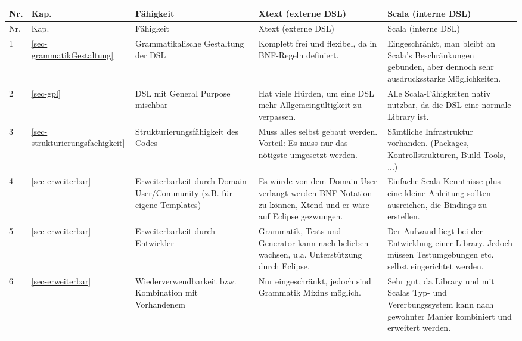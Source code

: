 \begin{landscape}
\begin{longtable}{|p{0.5cm}|p{0.8cm}|p{4.3cm}|p{6.3cm}|p{6.3cm}|}

  \hline
  Nr. & Kap. & Fähigkeit & Xtext (externe DSL) & Scala (interne DSL) \\ \hline \hline
  \endfirsthead

  \hline
  Nr. & Kap. & Fähigkeit & Xtext (externe DSL) & Scala (interne DSL) \\ \hline
  \endhead

  1
  & \ref{sec-grammatikGestaltung}
  & Grammatikalische Gestaltung der DSL
  & {\small Komplett frei und flexibel, da in BNF-Regeln definiert.}
  & {\small Eingeschränkt, man bleibt an Scala's Beschränkungen gebunden, aber
    dennoch sehr ausdrucksstarke Möglichkeiten.}
  \\\hline

  2
  & \ref{sec-gpl}
  & DSL mit General Purpose mischbar
  & {\small Hat viele Hürden, um eine DSL mehr Allgemeingültigkeit zu verpassen.}
  & {\small Alle Scala-Fähigkeiten nativ nutzbar, da die DSL eine normale Library ist.}
  \\\hline

  3
  & \ref{sec-strukturierungsfaehigkeit}
  & Strukturierungsfähigkeit des Codes
  & {\small Muss alles selbst gebaut werden. Vorteil: Es muss nur das nötigste
    umgesetzt werden.}
  & {\small Sämtliche Infrastruktur vorhanden. (Packages, Kontrollstrukturen,
    Build-Tools, ...)}
  \\\hline

  4
  & \ref{sec-erweiterbar}
  & Erweiterbarkeit durch Domain User/Community (z.B. für eigene Templates)
  & {\small Es würde von dem Domain User verlangt werden BNF-Notation zu können,
    Xtend und er wäre auf Eclipse gezwungen.}
  & {\small Einfache Scala Kenntnisse plus eine kleine Anleitung sollten ausreichen,
    die Bindings zu erstellen.}
  \\\hline

  5
  & \ref{sec-erweiterbar}
  & Erweiterbarkeit durch Entwickler
  & {\small Grammatik, Tests und Generator kann nach belieben wachsen, u.a.
    Unterstützung durch Eclipse.}
  & {\small Der Aufwand liegt bei der Entwicklung einer Library. Jedoch müssen
    Testumgebungen etc. selbst eingerichtet werden.}
  \\\hline

  6
  & \ref{sec-erweiterbar}
  & Wiederverwendbarkeit bzw. Kombination mit Vorhandenem
  & {\small Nur eingeschränkt, jedoch sind Grammatik Mixins möglich.}
  & {\small Sehr gut, da Library und mit Scalas Typ- und Vererbungssystem kann nach
    gewohnter Manier kombiniert und erweitert werden.}
  \\\hline


\end{longtable}
\end{landscape}
